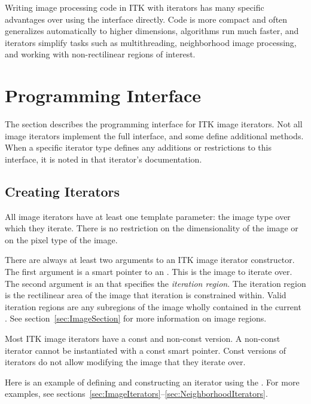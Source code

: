Writing image processing code in ITK with iterators has many specific
advantages over using the  interface directly.  Code is more
compact and often generalizes automatically to higher dimensions, algorithms
run much faster, and iterators simplify tasks such as multithreading,
neighborhood image processing, and working with non-rectilinear regions of
interest.


\section{Programming Interface}
\label{sec:IteratorsInterface}

The section describes the programming interface for ITK image iterators.  Not
all image iterators implement the full interface, and some define additional
methods.  When a specific iterator type defines any additions or restrictions to this
interface, it is noted in that iterator's documentation.

\subsection{Creating Iterators}
\label{sec:CreatingIterators}
All image iterators have at least one template parameter: the image type over
which they iterate.  There is no restriction on the dimensionality of the image
or on the pixel type of the image.

There are always at least two arguments to an ITK image iterator constructor.
The first argument is a smart pointer to an .  This is the
image to iterate over. The second argument is an
 that specifies the \emph{iteration region}.  The
iteration region is the rectilinear area of the image that iteration is
constrained within. Valid iteration regions are any subregions of the image
wholly contained in the current .  See
section~\ref{sec:ImageSection} for more information on image regions. 

Most ITK image iterators have a const and non-const version.  A non-const
iterator cannot be instantiated with a const  smart pointer.
Const versions of iterators do not allow modifying the image that they iterate
over.

Here is an example of defining and constructing an iterator using the
.  For more examples, see
sections~\ref{sec:ImageIterators}--\ref{sec:NeighborhoodIterators}.

